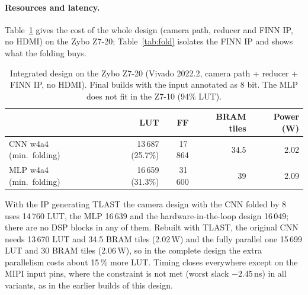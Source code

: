 \documentclass{article}
\begin{document}
\paragraph{Resources and latency.}
Table~\ref{tab:res} gives the cost of the whole design (camera path, reducer and FINN IP, no HDMI) on the Zybo Z7-20; Table~\ref{tab:fold} isolates the FINN IP and shows
what the folding buys.
\begin{table}[h]
\centering
\caption{Integrated design on the Zybo Z7-20 (Vivado 2022.2, camera path + reducer + FINN IP, no HDMI).
Final builds with the input annotated as 8 bit. The MLP does not fit in the Z7-10 (94\% LUT).}
\label{tab:res}
\begin{tabular}{lrrrr}
\toprule
 & LUT & FF & BRAM tiles & Power (W)\\
\midrule
CNN w4a4 (min.\ folding) & 13\,687 (25.7\%) & 17\,864 & 34.5 & 2.02\\
MLP w4a4 (min.\ folding) & 16\,659 (31.3\%) & 31\,600 & 39 & 2.09\\
\bottomrule
\end{tabular}
\end{table}
With the IP generating TLAST the camera design with the CNN folded by 8 uses 14\,760 LUT, the MLP 16\,639 and the hardware-in-the-loop design 16\,049; there are no DSP blocks in any of them. Rebuilt with TLAST, the original CNN needs 13\,670 LUT and 34.5 BRAM tiles (2.02\,W) and the fully parallel one 15\,699 LUT and 30 BRAM tiles (2.06\,W), so in the complete design the extra parallelism costs about 15\,\% more LUT.
Timing closes everywhere except on the MIPI input pins, where the constraint is not met (worst slack $-2.45$\,ns) in all variants, as in the earlier builds of this design.
\end{document}
